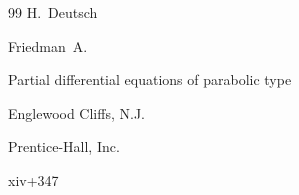 \begin{thebibliography}{99}
\publ H.~Deutsch






\by  Friedman~A.

\book Partial differential equations of parabolic type


\publaddr Englewood Cliffs, N.J.

\publ Prentice-Hall, Inc. 

\totalpages xiv+347 






\end{thebibliography}



\renewcommand{\baselinestretch}{0.9}



%

%

